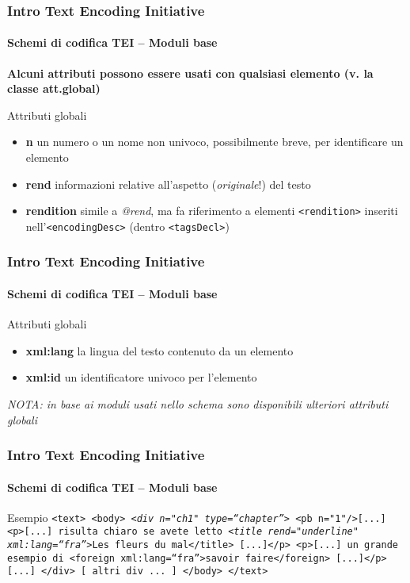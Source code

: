 \begin{frame}
	\frametitle{Intro Text Encoding Initiative}
	\framesubtitle{Schemi di codifica TEI – Moduli base}
	\addtocounter{nframe}{1}

    \textbf{Alcuni attributi possono essere usati con qualsiasi elemento (v. la classe att.global)}

    \begin{block}{ Attributi globali}
        \begin{itemize}
            \item \textbf{n} un numero o un nome non univoco, possibilmente breve, per identificare un elemento
            \item \textbf{rend} informazioni relative all’aspetto (\textit{originale}!) del testo
            \item \textbf{rendition} simile a \textit{@rend}, ma fa riferimento a elementi
            \texttt{<rendition>} inseriti nell’\texttt{<encodingDesc>} (dentro \texttt{<tagsDecl>})
        \end{itemize}
    \end{block}
\end{frame}

\begin{frame}
	\frametitle{Intro Text Encoding Initiative}
	\framesubtitle{Schemi di codifica TEI – Moduli base}
	\addtocounter{nframe}{1}

    \begin{block}{ Attributi globali}
        \begin{itemize}
            \item \textbf{xml:lang} la lingua del testo contenuto da un elemento
            \item \textbf{xml:id} un identificatore univoco per l’elemento
        \end{itemize}
       \textit{NOTA: in base ai moduli usati nello schema sono disponibili ulteriori attributi globali}
    \end{block}
\end{frame}

\begin{frame}
	\frametitle{Intro Text Encoding Initiative}
	\framesubtitle{Schemi di codifica TEI – Moduli base}
	\addtocounter{nframe}{1}

	\begin{block}{Esempio}
        \texttt{<text>
        <body>
        \emph{<div n="ch1" type=``chapter''>}
        <pb n="1"/>[...]
        <p>[...] risulta chiaro se avete letto \emph{<title
        rend="underline" xml:lang=``fra''>}Les fleurs du
        mal</title> [...]</p>
        <p>[...] un grande esempio di <foreign
        xml:lang=``fra''>savoir faire</foreign> [...]</p>
        [...]
        </div>
        [ altri div ... ]
        </body>
        </text>}
    \end{block}

\end{frame}


